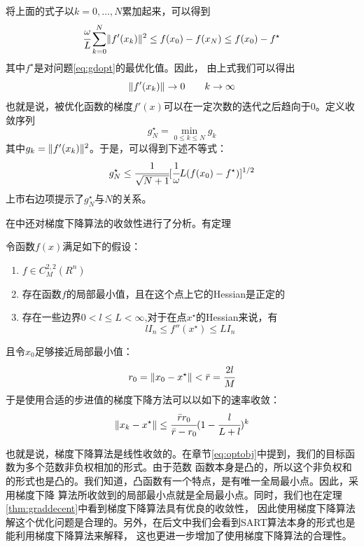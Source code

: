 将上面的式子以$k=0,\hdots,N$累加起来，可以得到
\begin{equation}
\cfrac{\omega}{L}\sum^N_{k=0}\lVert f'(x_k)\rVert^2\le f(x_0)-f(x_N)
\le f(x_0)-f^\star
\end{equation}
其中$f^\star$是对问题\eqref{eq:gdopt}的最优化值。因此，
由上式我们可以得出
\begin{equation*}
\lVert f'(x_k)\rVert\rightarrow 0 \qquad k\rightarrow \infty
\end{equation*}
也就是说，被优化函数的梯度$f'(x)$可以在一定次数的迭代之后趋向于$0$。定义收敛序列
\begin{equation*}
g^\star_N=\min_{0\le k\le N}g_k
\end{equation*}
其中$g_k=\lVert f'(x_k)\rVert^2$。于是，可以得到下述不等式：
\begin{equation}
g^\star_N \le \cfrac{1}{\sqrt{N+1}}[\cfrac{1}{\omega}L(f(x_0)-f^\star)]^{1/2}
\end{equation}
上市右边项提示了$g^\star_N$与$N$的关系。

在\cite{nesterov2003}中还对梯度下降算法的收敛性进行了分析。有定理
\begin{thm}\label{thm:graddecent}
令函数$f(x)$满足如下的假设：
\begin{enumerate}
\item{$f\in C^{2,2}_M(R^n)$}
\item{存在函数$f$的局部最小值，且在这个点上它的Hessian是正定的}
\item{存在一些边界$0<l\le L<\infty$,对于在点$x^\star$的Hessian来说，有
\begin{equation*}
lI_n\le f''(x^\star)\le LI_n
\end{equation*}}
\end{enumerate}
且令$x_0$足够接近局部最小值：
\begin{equation*}
r_0=\lVert x_0-x^\star\rVert<\bar{r}=\cfrac{2l}{M}
\end{equation*}
于是使用合适的步进值的梯度下降方法可以以如下的速率收敛：
\begin{equation*}
\lVert x_k-x^\star\rVert\le \cfrac{\bar{r}r_0}{\bar{r}-r_0}(1-\cfrac{l}{L+l})^k
\end{equation*}
\end{thm}
也就是说，梯度下降算法是线性收敛的。在章节\ref{eq:optobj}中提到，我们的目标函数为多个范数非负权相加的形式。由于范数
函数本身是凸的，所以这个非负权和的形式也是凸的。我们知道，凸函数有一个特点，是有唯一全局最小点。因此，采用梯度下降
算法所收敛到的局部最小点就是全局最小点。同时，我们也在定理\ref{thm:graddecent}中看到梯度下降算法具有优良的收敛性，
因此使用梯度下降算法解这个优化问题是合理的。另外，在后文中我们会看到SART算法本身的形式也是能利用梯度下降算法来解释，
这也更进一步增加了使用梯度下降算法的合理性。



